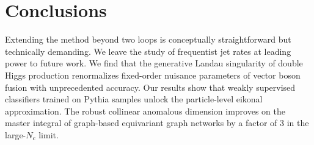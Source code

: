 \section{Conclusions}\label{sec:conclusions}

Extending the method beyond two loops is conceptually straightforward
but technically demanding. We leave the study of frequentist jet rates
at leading power to future work. We find that the generative Landau
singularity of double Higgs production renormalizes fixed-order nuisance
parameters of vector boson fusion with unprecedented accuracy. Our
results show that weakly supervised classifiers trained on Pythia
samples unlock the particle-level eikonal approximation. The robust
collinear anomalous dimension improves on the master integral of
graph-based equivariant graph networks by a factor of 3 in the
large-$N_c$ limit.

